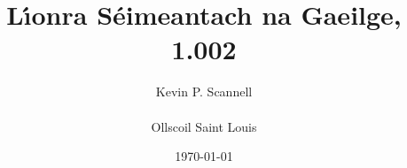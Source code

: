 \documentclass[8pt,twocolumn,openany]{extbook}
\begin{document}
\begin{frontmatter}
\title{\Huge\bf L\'{\i}onra S\'eimeantach na Gaeilge,
1.002} %
\author{{\Large Kevin P. Scannell}\\ \\ {\Large Ollscoil Saint Louis}}
\date{\today}
\maketitle
\onecolumn

\end{frontmatter}

\begin{mainmatter}
\twocolumn
\lhead{\large\bf \rightmark}
\rhead{\large\bf \leftmark}

\appendix
\lhead{}
\rhead{}

\end{mainmatter}

\begin{backmatter}
\onecolumn


%

\end{backmatter}
\end{document}
